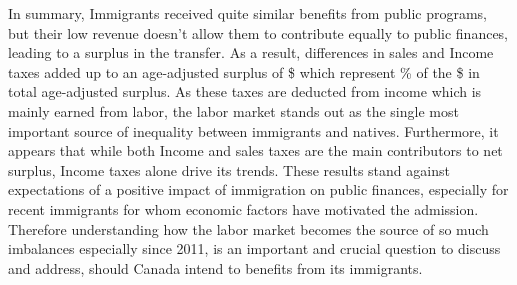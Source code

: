 \vspace{0.7em}\par
In summary, Immigrants received quite similar benefits from public programs, but their low revenue doesn't allow them to contribute equally to public finances, leading to a surplus in the transfer.
As a result, differences in sales and Income taxes added up to an age-adjusted surplus of \$ which  represent \% of the \$ in total age-adjusted surplus.
As these taxes are deducted from income which is mainly earned from labor, the labor market stands out as the single most important source of inequality between immigrants and natives.
Furthermore, it appears that while both Income and sales taxes are the main contributors to net surplus, Income taxes alone drive its trends.
These results stand against expectations of a positive impact of immigration on public finances, especially for recent immigrants for whom economic factors have motivated the admission.
Therefore understanding how the labor market becomes the source of so much imbalances especially since 2011, is an important and crucial question to discuss and address, should Canada intend to benefits from its immigrants.


















